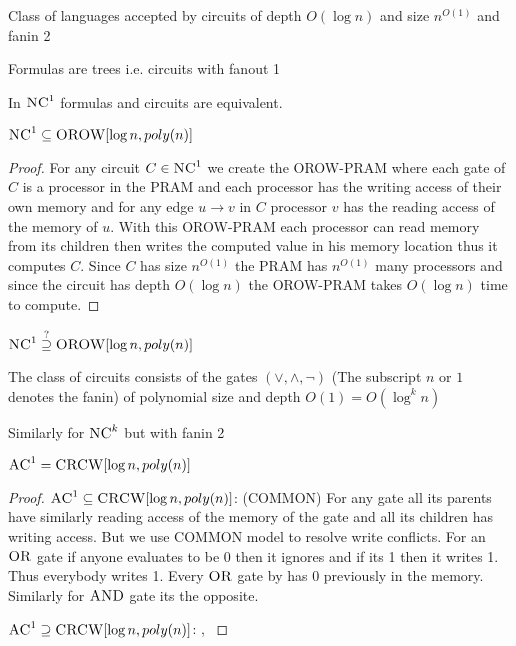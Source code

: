 \begin{definition}[$\textsc{NC}^1$]
	Class of languages accepted by circuits of depth $O(\log n)$  and size $n^{O(1)}$ and fanin 2
\end{definition}
\begin{definition}
	Formulas are trees i.e. circuits with fanout 1
\end{definition}
\begin{theorem}
	In $\textsc{NC}^1$ formulas and circuits are equivalent.
\end{theorem}
\begin{theorem}
	$\textsc{NC}^1\subseteq \textsc{OROW}[\log n, poly(n)]$
\end{theorem}
\begin{proof}
	For any circuit $C\in \textsc{NC}^1$  we create the \textsc{OROW-PRAM} where each gate of $C$ is a processor in the \textsc{PRAM} and each processor has the writing access of their own memory and for any edge $u\to v$ in $C$ processor $v$ has the reading access of the memory of $u$. With this \textsc{OROW-PRAM} each processor can read memory from its children then writes the computed value in his memory location thus it computes $C$. Since $C$ has size $n^{O(1)}$ the \textsc{PRAM} has $n^{O(1)}$ many processors and since the circuit has depth $O(\log n)$ the \textsc{OROW-PRAM} takes $O(\log n)$ time to compute. 
\end{proof}
\begin{open}
	$\textsc{NC}^1\overset{?}{\supseteq} \textsc{OROW}[\log n,poly(n)]$
\end{open}
\begin{definition}
		The class of circuits consists of the gates $(\vee,\wedge,\neg)$ (The subscript $n$ or $1$ denotes the fanin) of polynomial size and depth $O(1)=O(\log^k n)$ 
		
		Similarly for $\textsc{NC}^k$ but with fanin 2
\end{definition}
\begin{theorem}
	$\textsc{AC}^1=\textsc{CRCW}[\log n,poly(n)]$
\end{theorem}
\begin{proof} $\textsc{AC}^1\subseteq \textsc{CRCW}[\log n,poly(n)]$: (\textsc{COMMON}) For any gate all its parents have similarly reading  access of the memory of the gate and all its children has writing access. But we use \textsc{COMMON} model to resolve write conflicts. For an $\textsc{OR}$ gate if anyone evaluates to be 0 then it ignores and if its 1 then it writes 1. Thus everybody writes 1. Every $\textsc{OR}$ gate by  has 0 previously in the memory. Similarly for $\textsc{AND}$ gate its the opposite. 


$\textsc{AC}^1\supseteq \textsc{CRCW}[\log n,poly(n)]$: , \cite{ac1crcwstockmeyervishkin}
\end{proof}

